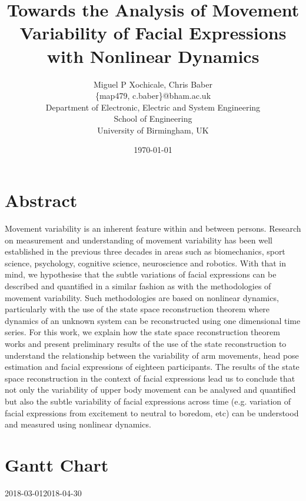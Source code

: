 \documentclass[12pt]{article}
\author{Miguel P Xochicale, Chris Baber \\
\{map479, c.baber\}@bham.ac.uk \\
Department of Electronic, Electric and System Engineering\\
School of Engineering\\
University of Birmingham, UK}
\title{Towards the Analysis of Movement Variability of Facial Expressions with
Nonlinear Dynamics}
\date{\today}
\begin{document}
\maketitle

\section*{Abstract}
Movement variability is an inherent feature within and between persons.
Research on measurement and understanding of movement variability has been well
established in the previous three decades in areas such as biomechanics,
sport science, psychology, cognitive science, neuroscience and robotics.
With that in mind, we hypothesise that the subtle variations of facial expressions
can be described and quantified in a similar fashion as with the methodologies
of movement variability.
Such methodologies are based on nonlinear dynamics, particularly with the use of
the state space reconstruction theorem where dynamics of an unknown system
can be reconstructed using one dimensional time series.
For this work, we explain how the state space reconstruction theorem works and
present preliminary results of the use of the state reconstruction
to understand the relationship between the variability of arm movements, head
pose estimation and facial expressions of eighteen participants.
The results of the state space reconstruction in the context of facial expressions
lead us to conclude that not only the variability of upper body movement can be
analysed and quantified but also the subtle variability of facial expressions
across time (e.g. variation of facial expressions from excitement to neutral to boredom, etc)
can be understood and measured using nonlinear dynamics.


\section*{Gantt Chart}

\begin{ganttchart}[
	hgrid,
	vgrid,
	x unit=2mm,
	time slot format=isodate-yearmonth
	]{2018-03-01}{2018-04-30}
 \\
 \\
 
\end{ganttchart}
\end{document}
